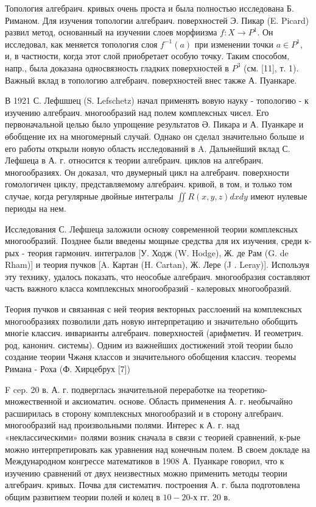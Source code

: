 \documentclass[10pt]{article}
\begin{document}
Топология алгебраич. кривых очень проста и была полностью исследована Б. Риманом. Для изучения топологии алгебраич. поверхностей Э. Пикар (E. Picard) развил метод, основанный на изучении слоев морфиизма $f: X \rightarrow P^{1}$. Он исследовал, как меняется топология слоя $f^{-1}(a)$ при изменении точки $a \in P^{1}$, и, в частности, когда этот слой приобретает особую точку. Таким способом, напр., была доказана односвязность гладких поверхностей в $P^{3}$ (см. [11], т. 1). Важный вклад в топологию алгебраич. поверхностей внес также А. Пуанкаре.



В 1921 С. Лефшшец (S. Lefschetz) начал применять вовую науку - топологию - к изучению алгебраич. многообразий над полем комплексных чисел. Его первоначальной целью было упрощение результатов Ә. Пикара и А. Пуанкаре и өбобщение их на многомерный случай. Однако он сделал значительно больше и его работы открыли новую область исследований в A. Дальнейший вклад С. Лефшеца в А. г. относится к теории алгебраич. циклов на алгебраич. многообразиях. Он доказал, что двумерный цикл на алгебраич. поверхности гомологичен циклу, представляемому алгебраич. кривой, в том, и только том случае, когда регулярные двойные интегралы $\iint R(x, y, z) d x d y$ имеют нулевые периоды на нем.



Исследования С. Лефшеца заложили основу современной теории комплексных многообразий. Позднее были введены мощные средства для их изучения, среди к-рых - теория гармонич. интегралов [У. Ходж (W. Hodge), Ж. де Рам (G. de Rham)] и теория пучков [A. Картан (H. Cartan), Ж. Лере (J . Leray)]. Используя эту технику, удалось показать, что неособые алгебраич. многообразия составляют часть важного класса комплексных многообразий - кәлеровых многообразий.



Теория пучков и связанная с ней теория векторных расслоений на комплексных многообразиях позволили дать новую интерпретацию и значительно обобщить многіе классич. инварианты алгебраич. поверхностей (арифметич. И геометрич. род, канонич. системы). Одним из важнейших достижений этой теории было создание теории Чжәня классов и значительного обобщения классич. теоремы Римана - Роха (Ф. Хирцебрух [7])



F cep. 20 в. А. г. подверглась значительной переработке на теоретико-множественной и аксиоматич. основе. Область применения А. г. необычайно расширилась в сторону комплексных многообразий и в сторону алгебраич. многообразий над произвольными полями. Интерес к А. г. над «неклассическими» полями возник сначала в связи с теорией сравнений, к-рые можно интерпретировать как уравнения над конечным полем. В своем докладе на Международном конгрессе математиков в 1908 А. Пуанкаре говорил, что к изучению сравнений от двух неизвестных можно применить методы теории алгебраич. кривых. Почва для систематич. построения А. г. была подготовлена общим развитием теории полей и колец в $10-20$-х гг. 20 в.
\end{document}
